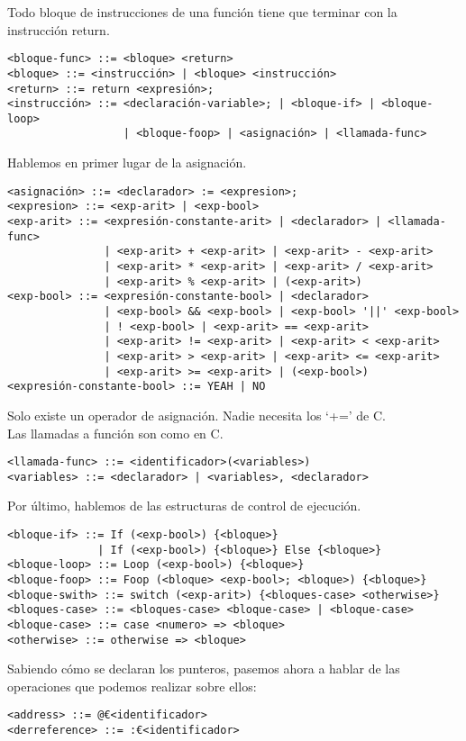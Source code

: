 \documentclass[spanish, a4paper, 12pt] {article}
\begin{document}
Todo bloque de instrucciones de una función tiene que terminar con la instrucción return.
\begin{verbatim}
<bloque-func> ::= <bloque> <return>
<bloque> ::= <instrucción> | <bloque> <instrucción>
<return> ::= return <expresión>;
<instrucción> ::= <declaración-variable>; | <bloque-if> | <bloque-loop>
                  | <bloque-foop> | <asignación> | <llamada-func>
\end{verbatim}
Hablemos en primer lugar de la asignación.
\begin{verbatim}
<asignación> ::= <declarador> := <expresion>;
<expresion> ::= <exp-arit> | <exp-bool>
<exp-arit> ::= <expresión-constante-arit> | <declarador> | <llamada-func>
               | <exp-arit> + <exp-arit> | <exp-arit> - <exp-arit>
               | <exp-arit> * <exp-arit> | <exp-arit> / <exp-arit>
               | <exp-arit> % <exp-arit> | (<exp-arit>)
<exp-bool> ::= <expresión-constante-bool> | <declarador>
               | <exp-bool> && <exp-bool> | <exp-bool> '||' <exp-bool>
               | ! <exp-bool> | <exp-arit> == <exp-arit>
               | <exp-arit> != <exp-arit> | <exp-arit> < <exp-arit>
               | <exp-arit> > <exp-arit> | <exp-arit> <= <exp-arit>
               | <exp-arit> >= <exp-arit> | (<exp-bool>)
<expresión-constante-bool> ::= YEAH | NO
\end{verbatim}
Solo existe un operador de asignación. Nadie necesita los `+=' de C.\\

Las llamadas a función son como en C.
\begin{verbatim}
<llamada-func> ::= <identificador>(<variables>)
<variables> ::= <declarador> | <variables>, <declarador>
\end{verbatim}
Por último, hablemos de las estructuras de control de ejecución.
\begin{verbatim}
<bloque-if> ::= If (<exp-bool>) {<bloque>}
              | If (<exp-bool>) {<bloque>} Else {<bloque>}
<bloque-loop> ::= Loop (<exp-bool>) {<bloque>}
<bloque-foop> ::= Foop (<bloque> <exp-bool>; <bloque>) {<bloque>}
<bloque-swith> ::= switch (<exp-arit>) {<bloques-case> <otherwise>}
<bloques-case> ::= <bloques-case> <bloque-case> | <bloque-case>
<bloque-case> ::= case <numero> => <bloque>
<otherwise> ::= otherwise => <bloque>
\end{verbatim}

Sabiendo cómo se declaran los punteros, pasemos ahora a hablar de las operaciones que podemos realizar sobre ellos:

\begin{verbatim}
<address> ::= @€<identificador>
<derreference> ::= :€<identificador>
\end{verbatim}
\end{document}
